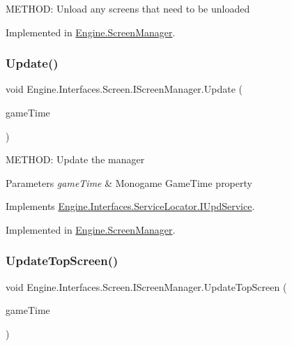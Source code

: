 M\+E\+T\+H\+OD\+: Unload any screens that need to be unloaded 



Implemented in \hyperlink{a00538_a1e85d6cc74fdb929f4729d1170886fb4}{Engine.\+Screen\+Manager}.

\mbox{\label{a00470_afc42708b653397ca8a3a81dc8d244c61}} 
\subsubsection{\texorpdfstring{Update()}{Update()}}
{\footnotesize\ttfamily void Engine.\+Interfaces.\+Screen.\+I\+Screen\+Manager.\+Update (\begin{DoxyParamCaption}\item[{Game\+Time}]{game\+Time }\end{DoxyParamCaption})}



M\+E\+T\+H\+OD\+: Update the manager 


\begin{DoxyParams}{Parameters}
{\em game\+Time} & Monogame Game\+Time property\\
\hline
\end{DoxyParams}


Implements \hyperlink{a00478_a387fce2a5440a4dc63f8d72772ecbdaa}{Engine.\+Interfaces.\+Service\+Locator.\+I\+Upd\+Service}.



Implemented in \hyperlink{a00538_a9abaa968b161ebb2b84c7a47ada52f90}{Engine.\+Screen\+Manager}.

\mbox{\label{a00470_aff4347b40d3fd6173e0c420adbf1146f}} 
\subsubsection{\texorpdfstring{Update\+Top\+Screen()}{UpdateTopScreen()}}
{\footnotesize\ttfamily void Engine.\+Interfaces.\+Screen.\+I\+Screen\+Manager.\+Update\+Top\+Screen (\begin{DoxyParamCaption}\item[{Game\+Time}]{game\+Time }\end{DoxyParamCaption})}



